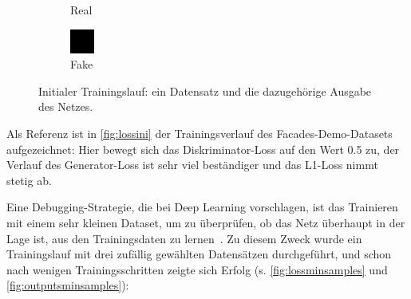 \begin{figure}
\begin{subfigure}{.19\textwidth}
		\caption{Real}
	\end{subfigure}
	\begin{subfigure}{.19\textwidth}
		\centering
		\includegraphics[width=.9\linewidth,interpolate=false]{img/results/initial_fake}
		\caption{Fake}
	\end{subfigure}
	\caption{Initialer Trainingslauf: ein Datensatz und die dazugehörige Ausgabe des Netzes.}
	\label{fig:outputsini}
\end{figure}

Als Referenz ist in \autoref{fig:lossini} der Trainingsverlauf des Facades-Demo-Datasets aufgezeichnet:
Hier bewegt sich das Diskriminator-Loss auf den Wert 0.5 zu, der Verlauf des Generator-Loss ist sehr viel beständiger und das L1-Loss nimmt stetig ab.

Eine Debugging-Strategie, die \citeauthor{Goodfellow.2016} bei Deep Learning vorschlagen, ist das Trainieren mit einem sehr kleinen Dataset, um zu überprüfen, ob das Netz überhaupt in der Lage ist, aus den Trainingsdaten zu lernen~\cite{Goodfellow.2016}.
Zu diesem Zweck wurde ein Trainingslauf mit drei zufällig gewählten Datensätzen durchgeführt, und schon nach wenigen Trainingsschritten zeigte sich Erfolg (s. \autoref{fig:lossminsamples} und \autoref{fig:outputsminsamples}):


